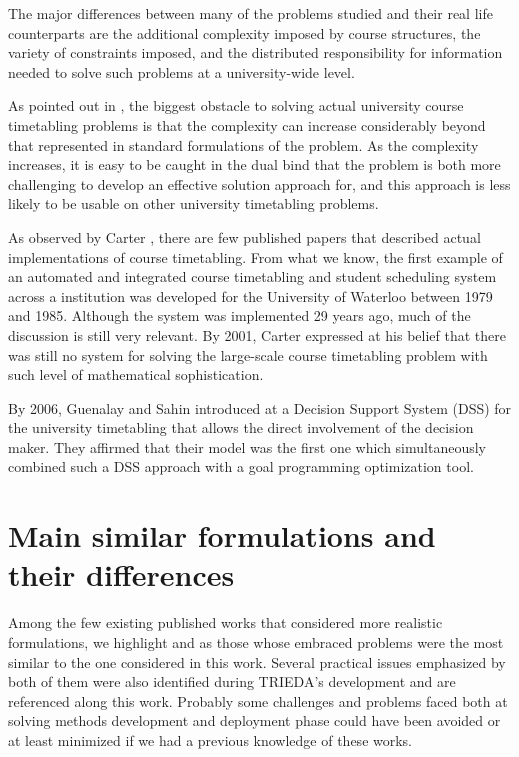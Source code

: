 The major differences between many of the problems studied and their real life counterparts are the additional complexity imposed by course structures, the variety of constraints imposed, and the distributed responsibility for information needed to solve such problems at a university-wide level.

As pointed out in \cite{Murray2007}, the biggest obstacle to solving actual university course timetabling problems is that the complexity can increase considerably beyond that represented in standard formulations of the problem. As the complexity increases, it is easy to be caught in the dual bind that the problem is both more challenging to develop an effective solution approach for, and this approach is less likely to be usable on other university timetabling problems.

As observed by Carter \cite{Carter2001}, there are few published papers that described actual implementations of course timetabling. From what we know, the first example of an automated and integrated course timetabling and student scheduling system across a institution was developed for the University of Waterloo between 1979 and 1985. Although the system was implemented 29 years ago, much of the discussion is still very relevant. By 2001, Carter expressed at \cite{Carter2001} his belief that there was still no system for solving the large-scale course timetabling problem with such level of mathematical sophistication.

By 2006, Guenalay and Sahin introduced at \cite{Guenalay2006} a Decision Support System (DSS) for the university timetabling that allows the direct involvement of the decision maker. They affirmed that their model was the first one which simultaneously combined such a DSS approach with a goal programming optimization tool.



\section{Main similar formulations and their differences}

Among the few existing published works that considered more realistic formulations, we highlight \cite{Carter2001} and \cite{Murray2007} as those whose embraced problems were the most similar to the one considered in this work. Several practical issues emphasized by both of them were also identified during TRIEDA's development and are referenced along this work. Probably some challenges and problems faced both at solving methods development and deployment phase could have been avoided or at least minimized if we had a previous knowledge of these works.


